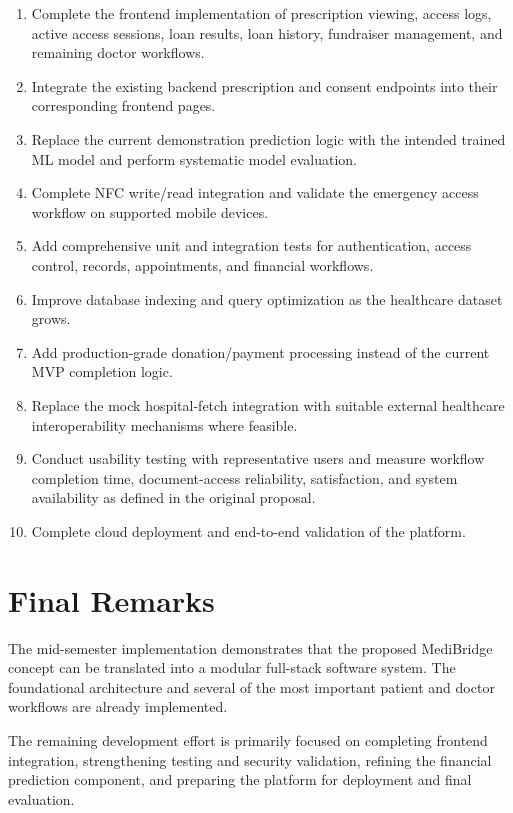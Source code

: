 \documentclass{tietreport}
\begin{document}
\begin{enumerate}
  \item Complete the frontend implementation of prescription viewing,
    access logs, active access sessions, loan results, loan history,
    fundraiser management, and remaining doctor workflows.

  \item Integrate the existing backend prescription and consent
    endpoints into their corresponding frontend pages.

  \item Replace the current demonstration prediction logic with the
    intended trained ML model and perform systematic model evaluation.

  \item Complete NFC write/read integration and validate the emergency
    access workflow on supported mobile devices.

  \item Add comprehensive unit and integration tests for authentication,
    access control, records, appointments, and financial workflows.

  \item Improve database indexing and query optimization as the
    healthcare dataset grows.

  \item Add production-grade donation/payment processing instead of the
    current MVP completion logic.

  \item Replace the mock hospital-fetch integration with suitable
    external healthcare interoperability mechanisms where feasible.

  \item Conduct usability testing with representative users and measure
    workflow completion time, document-access reliability,
    satisfaction, and system availability as defined in the original
    proposal.

  \item Complete cloud deployment and end-to-end validation of the
    platform.
\end{enumerate}

\section{Final Remarks}

The mid-semester implementation demonstrates that the proposed
MediBridge concept can be translated into a modular full-stack
software system. The foundational architecture and several of the most
important patient and doctor workflows are already implemented.

The remaining development effort is primarily focused on completing
frontend integration, strengthening testing and security validation,
refining the financial prediction component, and preparing the platform
for deployment and final evaluation.


\printbibliography[heading=bibintoc]
\end{document}
